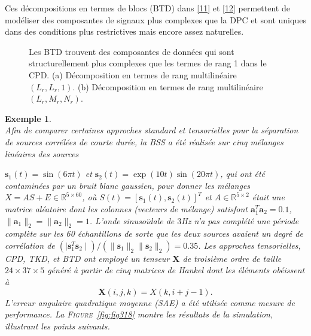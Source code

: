 \documentclass[11pt,a4paper,oneside]{book}
\newtheorem{ex}{Exemple}[chapter]}
\newcommand{\encad}[1]{%
 \fbox{\begin{minipage}[t]{\linewidth}%
  #1\end{minipage}}}
\def\R{\mathbb R}
\def\a{\mathbf a}
\def\s{\mathbf s}
\newcommand{\mbf}[1]{\mathbf{#1}}
\newcommand{\figref}[1]{\textsc{Figure}~\ref{#1}}
\begin{document}
  Ces décompositions en termes de blocs (BTD) dans \eqref{11} et \eqref{12} permettent de modéliser des composantes de signaux plus complexes que la DPC et sont uniques dans des conditions plus restrictives mais encore assez naturelles.

 \begin{figure}[!h]
 	\encad{\centering
 	\texttt{[image: "My figures/FIG317"]}}
 	\caption{Les BTD trouvent des composantes de données qui sont structurellement plus complexes que les termes de rang 1 dans le CPD. (a) Décomposition en termes de rang multilinéaire $ (L_{r},L_{r},1) $. (b) Décomposition en termes de rang multilinéaire $ (L_{r},M_{r},N_{r}) $.}
 	\label{fig:fig317}
 \end{figure}

\begin{ex}\label{exoTKD}
\emph{\\} 
Afin de comparer certaines approches standard et tensorielles pour la séparation de sources corrélées de courte durée, la BSS a été réalisée sur cinq mélanges linéaires des sources 

$ \s_{1}(t)=\sin(6\pi t) $ et $ \s_{2}(t)=\exp(10t)\sin(20\pi t) $, qui ont été contaminées par un bruit blanc gaussien, pour donner les mélanges $ X=AS+E\in\R^{5\times 60} $, où $ S(t)=[\s_{1}(t),\s_{2}(t)]^{T} $  et $ A\in\R^{5\times 2} $ était une matrice aléatoire dont les colonnes (vecteurs de mélange) satisfont $ \a_{1}^{T}\a_{2}=0.1 $, $ \parallel\a_{1} \parallel_{2}=\parallel\a_{2}\parallel_{2}=1$. L'onde sinusoïdale de $ 3 $Hz n'a pas complété une période complète sur les 60 échantillons de sorte que les deux sources avaient un degré de corrélation de $ \left(\mid \s_{1}^{T}\s_{2}\mid\right)/\left(\parallel\s_{1}\parallel_{2}\parallel\s_{2}\parallel_{2}\right)=0.35 $. Les approches tensorielles, CPD, TKD, et BTD ont employé un tenseur $ \mbf{X} $ de troisième ordre de taille $ 24 \times 37 \times  5 $ généré à partir de cinq matrices de Hankel dont les éléments obéissent à \begin{equation*}
\mbf{X}(i,j,k)=X(k,i+j-1).
\end{equation*}
L'erreur angulaire quadratique moyenne (SAE) a été utilisée comme mesure de performance. La \figref{fig:fig318} montre les résultats de la simulation, illustrant les points suivants.


\end{ex}
\end{document}
